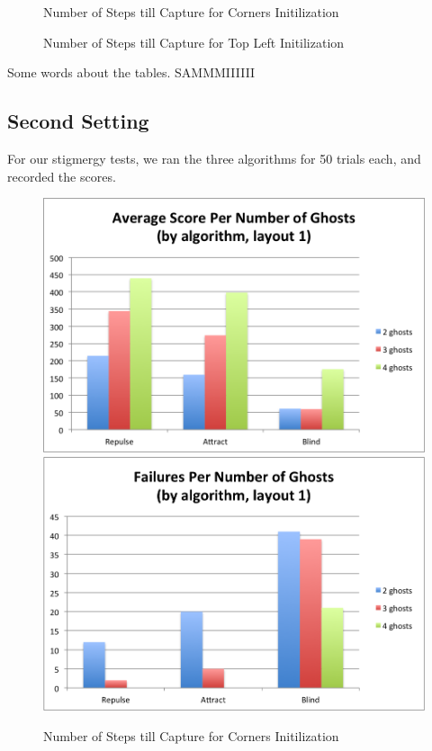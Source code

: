 \documentclass[11pt]{article}
\begin{document}
\begin{figure}[H]
	\caption{Number of Steps till Capture for Corners Initilization}
\end{figure}

\begin{figure}[H]
	\caption{Number of Steps till Capture for Top Left Initilization}
\end{figure}


\begin{multicols}{2}

Some words about the tables. SAMMMIIIIII

\subsection{Second Setting}
For our stigmergy tests, we ran the three algorithms for 50 trials each, and recorded the scores.  
\end{multicols}

\begin{figure}[H]
	\includegraphics[width=0.5 \columnwidth]{stigmergytrendclassicscore.png}
	\includegraphics[width= 0.5 \columnwidth]{stigmergytrendclassicfail.png}
	\caption{Number of Steps till Capture for Corners Initilization}
\end{figure}
\end{document}
